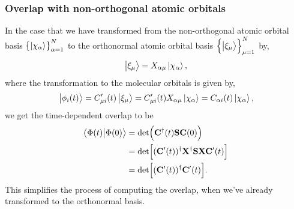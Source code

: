         \subsubsection{Overlap with non-orthogonal atomic orbitals}
            In the case that we have transformed from the non-orthogonal atomic
            orbital basis $\left\{ \ket{\chi_{\alpha}} \right\}_{\alpha = 1}^{N}$ to the
            orthonormal atomic orbital basis $\left\{ \ket{\xi_{\mu}} \right\}_{\mu =
            1}^{N}$ by,
            \begin{align}
                \ket{\xi_{\mu}} = X_{\alpha\mu}\ket{\chi_{\alpha}},
            \end{align}
            where the transformation to the molecular orbitals is given by,
            \begin{align}
                \ket{\phi_{i}(t)} = C_{\mu i}'(t)\ket{\xi_{\mu}}
                = C_{\mu i}'(t)X_{\alpha\mu}\ket{\chi_{\alpha}}
                = C_{\alpha i}(t)\ket{\chi_{\alpha}},
            \end{align}
            we get the time-dependent overlap to be
            \begin{align}
                \braket{\Phi(t)}{\Phi(0)}
                &= \det(\mathbf{C}^{\dagger}(t)\mathbf{S}\mathbf{C}(0))
                \\
                &= \det\Bigl[
                    (\mathbf{C}'(t))^{\dagger} \mathbf{X}^{\dagger}
                    \mathbf{S}\mathbf{X}\mathbf{C}'(t)
                \Bigr]
                \\
                &=
                \det\Bigl[
                    (\mathbf{C}'(t))^{\dagger}
                    \mathbf{C}'(t)
                \Bigr].
            \end{align}
            This simplifies the process of computing the overlap, when we've
            already transformed to the orthonormal basis.
